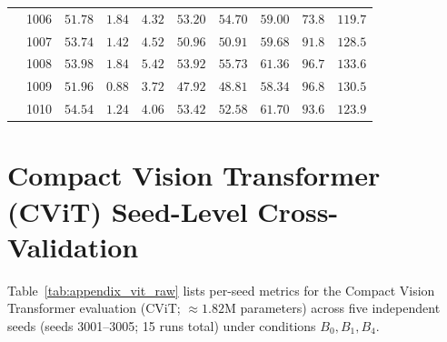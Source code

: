 \documentclass[sn-mathphys,Numbered]{sn-jnl}
\begin{document}
\begin{appendices}
\begin{table}[t]
{\begin{tabular}{l c c c c c c c c c}
 & 1006 & $51.78$ & $1.84$ & $4.32$ & $53.20$ & $54.70$ & $59.00$ & $73.8$ & $119.7$ \\
 & 1007 & $53.74$ & $1.42$ & $4.52$ & $50.96$ & $50.91$ & $59.68$ & $91.8$ & $128.5$ \\
 & 1008 & $53.98$ & $1.84$ & $5.42$ & $53.92$ & $55.73$ & $61.36$ & $96.7$ & $133.6$ \\
 & 1009 & $51.96$ & $0.88$ & $3.72$ & $47.92$ & $48.81$ & $58.34$ & $96.8$ & $130.5$ \\
 & 1010 & $54.54$ & $1.24$ & $4.06$ & $53.42$ & $52.58$ & $61.70$ & $93.6$ & $123.9$ \\
\bottomrule
\end{tabular}%
}
\end{table}

\clearpage
\section{Compact Vision Transformer (CViT) Seed-Level Cross-Validation}\label{sec:appendix_vit}

Table~\ref{tab:appendix_vit_raw} lists per-seed metrics for the Compact Vision Transformer evaluation (CViT; $\approx 1.82\mathrm{M}$ parameters) across five independent seeds (seeds 3001--3005; 15 runs total) under conditions $B_0, B_1, B_4$.


\end{appendices}
\end{document}
